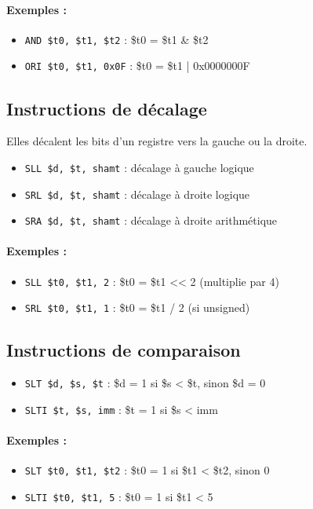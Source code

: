 \documentclass[12pt,a4paper]{article}
\begin{document}
\paragraph{Exemples :}
\begin{itemize}
  \item \texttt{AND \$t0, \$t1, \$t2} : \$t0 = \$t1 \& \$t2
  \item \texttt{ORI \$t0, \$t1, 0x0F} : \$t0 = \$t1 | 0x0000000F
\end{itemize}

\subsection{Instructions de décalage}
Elles décalent les bits d’un registre vers la gauche ou la droite.

\begin{itemize}
  \item \texttt{SLL \$d, \$t, shamt} : décalage à gauche logique
  \item \texttt{SRL \$d, \$t, shamt} : décalage à droite logique
  \item \texttt{SRA \$d, \$t, shamt} : décalage à droite arithmétique
\end{itemize}

\paragraph{Exemples :}
\begin{itemize}
  \item \texttt{SLL \$t0, \$t1, 2} : \$t0 = \$t1 << 2 (multiplie par 4)
  \item \texttt{SRL \$t0, \$t1, 1} : \$t0 = \$t1 / 2 (si unsigned)
\end{itemize}

\subsection{Instructions de comparaison}

\begin{itemize}
  \item \texttt{SLT \$d, \$s, \$t} : \$d = 1 si \$s < \$t, sinon \$d = 0
  \item \texttt{SLTI \$t, \$s, imm} : \$t = 1 si \$s < imm
\end{itemize}

\paragraph{Exemples :}
\begin{itemize}
  \item \texttt{SLT \$t0, \$t1, \$t2} : \$t0 = 1 si \$t1 < \$t2, sinon 0
  \item \texttt{SLTI \$t0, \$t1, 5} : \$t0 = 1 si \$t1 < 5
\end{itemize}
\end{document}
